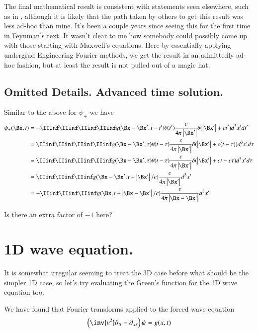 The final mathematical result is consistent with statements seen elsewhere, such as in \citep{feynman1963flp}, although it is
likely that the path taken by others to get this result was less ad-hoc than mine.
It's been a couple years since seeing this for the
first time in Feynman's text.
It wasn't clear to me how somebody could possibly come up with those starting with Maxwell's equations.
Here by essentially applying undergrad Engineering Fourier methods, we get the result in an admittedly ad-hoc fashion, but at least the result is not
pulled out of a magic hat.

\subsection{Omitted Details.  Advanced time solution. }

Similar to the above for $\psi_{+}$ we have
\begin{align*}
{\psi}_{+}(\Bx, t)
&= -\IIinf \IIinf \IIinf \IIinf g(\Bx - \Bx', t - t') \theta(t') \frac{c }{4\pi \Abs{\Bx'}} \delta(\Abs{\Bx'} + c t') d^3 x' dt' \\
&= \IIinf \IIinf \IIinf \IIinf g(\Bx - \Bx', \tau) \theta(t -\tau) \frac{c }{4\pi \Abs{\Bx'}} \delta(\Abs{\Bx'} + c (t -\tau)) d^3 x' d\tau \\
&= \IIinf \IIinf \IIinf \IIinf g(\Bx - \Bx', \tau) \theta(t -\tau) \frac{c }{4\pi \Abs{\Bx'}} \delta(\Abs{\Bx'} + c t -c\tau) d^3 x' d\tau \\
&= \IIinf \IIinf \IIinf g(\Bx - \Bx', t + \Abs{\Bx'}/c) \frac{c }{4\pi \Abs{\Bx'}} d^3 x' \\
&= -\IIinf \IIinf \IIinf g(\Bx, t + \Abs{\Bx -\Bx'}/c) \frac{c }{4\pi \Abs{\Bx -\Bx'}} d^3 x' \\
\end{align*}

Is there an extra factor of $-1$ here?

\section{1D wave equation. }

It is somewhat irregular seeming to treat the 3D case before what should be the simpler 1D case, so let's
try evaluating the Green's function for the 1D wave equation too.

We have found that Fourier transforms applied to the forced wave equation
\begin{align}
\left( \inv{v^2} \partial_{tt} -\partial_{xx} \right)\psi = g(x,t)
\end{align}

